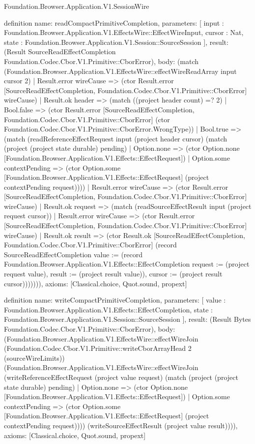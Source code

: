 \begin{lexlean}{Foundation.Browser.Application.V1.SessionWire}
\begin{semanticmodule}
definition{
  name: readCompactPrimitiveCompletion,
  parameters: [
    input : Foundation.Browser.Application.V1.EffectsWire::EffectWireInput,
    cursor : Nat,
    state : Foundation.Browser.Application.V1.Session::SourceSession
  ],
  result: (Result SourceReadEffectCompletion Foundation.Codec.Cbor.V1.Primitive::CborError),
  body: (match (Foundation.Browser.Application.V1.EffectsWire::effectWireReadArray input cursor 2)
    | Result.error wireCause => (ctor Result.error [SourceReadEffectCompletion, Foundation.Codec.Cbor.V1.Primitive::CborError] wireCause)
    | Result.ok header => (match ((project header count) =? 2)
      | Bool.false => (ctor Result.error [SourceReadEffectCompletion, Foundation.Codec.Cbor.V1.Primitive::CborError] (ctor Foundation.Codec.Cbor.V1.Primitive::CborError.WrongType))
      | Bool.true => (match (readReferenceEffectRequest input (project header cursor) (match (project (project state durable) pending)
          | Option.none => (ctor Option.none [Foundation.Browser.Application.V1.Effects::EffectRequest])
          | Option.some contextPending => (ctor Option.some [Foundation.Browser.Application.V1.Effects::EffectRequest] (project contextPending request))))
        | Result.error wireCause => (ctor Result.error [SourceReadEffectCompletion, Foundation.Codec.Cbor.V1.Primitive::CborError] wireCause)
        | Result.ok request => (match (readSourceEffectResult input (project request cursor))
          | Result.error wireCause => (ctor Result.error [SourceReadEffectCompletion, Foundation.Codec.Cbor.V1.Primitive::CborError] wireCause)
          | Result.ok result => (ctor Result.ok [SourceReadEffectCompletion, Foundation.Codec.Cbor.V1.Primitive::CborError] (record SourceReadEffectCompletion {value := (record Foundation.Browser.Application.V1.Effects::EffectCompletion {request := (project request value), result := (project result value)}), cursor := (project result cursor)})))))),
  axioms: [Classical.choice, Quot.sound, propext]
}

definition{
  name: writeCompactPrimitiveCompletion,
  parameters: [
    value : Foundation.Browser.Application.V1.Effects::EffectCompletion,
    state : Foundation.Browser.Application.V1.Session::SourceSession
  ],
  result: (Result Bytes Foundation.Codec.Cbor.V1.Primitive::CborError),
  body: (Foundation.Browser.Application.V1.EffectsWire::effectWireJoin (Foundation.Codec.Cbor.V1.Primitive::writeCborArrayHead 2 (sourceWireLimits)) (Foundation.Browser.Application.V1.EffectsWire::effectWireJoin (writeReferenceEffectRequest (project value request) (match (project (project state durable) pending)
    | Option.none => (ctor Option.none [Foundation.Browser.Application.V1.Effects::EffectRequest])
    | Option.some contextPending => (ctor Option.some [Foundation.Browser.Application.V1.Effects::EffectRequest] (project contextPending request)))) (writeSourceEffectResult (project value result)))),
  axioms: [Classical.choice, Quot.sound, propext]
}


\end{semanticmodule}
\end{lexlean}
